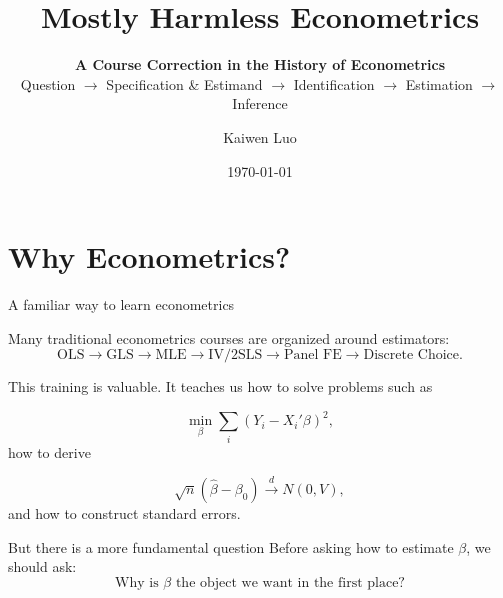 \documentclass[aspectratio=169,11pt]{beamer}
\title{Mostly Harmless Econometrics}
\subtitle{
\textbf{A Course Correction in the History of Econometrics}
\\[0.55em]
Question $\rightarrow$ Specification \& Estimand
$\rightarrow$ Identification
$\rightarrow$ Estimation
$\rightarrow$ Inference
}
\author{Kaiwen Luo}
\institute{Washington University in St.Louis}
\date{\today}
\begin{document}
\begin{frame}
    \titlepage
\end{frame}

\section{Why Econometrics?}

\begin{frame}{A familiar way to learn econometrics}

Many traditional econometrics courses are organized around estimators:
\[
\text{OLS}
\rightarrow
\text{GLS}
\rightarrow
\text{MLE}
\rightarrow
\text{IV/2SLS}
\rightarrow
\text{Panel FE}
\rightarrow
\text{Discrete Choice}.
\]

\pause

\vspace{0.3em}

This training is valuable. It teaches us how to solve problems such as

\[
\min_{\beta}\sum_i (Y_i-X_i'\beta)^2,
\]
how to derive

\[
\sqrt{n}(\hat\beta-\beta_0)
\overset{d}{\longrightarrow}
N(0,V),
\]
and how to construct standard errors.

\pause

\vspace{0.35em}

\begin{alertblock}{But there is a more fundamental question}
Before asking how to estimate $\beta$, we should ask:
\[
\boxed{\text{Why is } \beta \text{ the object we want in the first place?}}
\]
\end{alertblock}

\end{frame}
\end{document}
